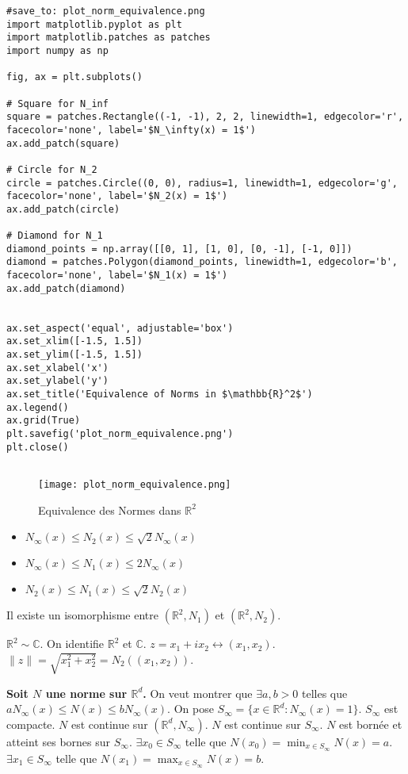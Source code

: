 \documentclass{article}
\begin{document}
\begin{verbatim}
#save_to: plot_norm_equivalence.png
import matplotlib.pyplot as plt
import matplotlib.patches as patches
import numpy as np

fig, ax = plt.subplots()

# Square for N_inf
square = patches.Rectangle((-1, -1), 2, 2, linewidth=1, edgecolor='r', facecolor='none', label='$N_\infty(x) = 1$')
ax.add_patch(square)

# Circle for N_2
circle = patches.Circle((0, 0), radius=1, linewidth=1, edgecolor='g', facecolor='none', label='$N_2(x) = 1$')
ax.add_patch(circle)

# Diamond for N_1
diamond_points = np.array([[0, 1], [1, 0], [0, -1], [-1, 0]])
diamond = patches.Polygon(diamond_points, linewidth=1, edgecolor='b', facecolor='none', label='$N_1(x) = 1$')
ax.add_patch(diamond)


ax.set_aspect('equal', adjustable='box')
ax.set_xlim([-1.5, 1.5])
ax.set_ylim([-1.5, 1.5])
ax.set_xlabel('x')
ax.set_ylabel('y')
ax.set_title('Equivalence of Norms in $\mathbb{R}^2$')
ax.legend()
ax.grid(True)
plt.savefig('plot_norm_equivalence.png')
plt.close()


\end{verbatim}

\begin{figure}[h]
    \centering
    \texttt{[image: plot\_norm\_equivalence.png]}
    \caption{Equivalence des Normes dans $\mathbb{R}^2$}
    \label{fig:plot_norm_equivalence}
\end{figure}
\begin{itemize}
    \item $N_\infty(x) \leq N_2(x) \leq \sqrt{2} N_\infty(x)$
    \item $N_\infty(x) \leq N_1(x) \leq 2 N_\infty(x)$
    \item $N_2(x) \leq N_1(x) \leq \sqrt{2} N_2(x)$
\end{itemize}
Il existe un isomorphisme entre $(\mathbb{R}^2, N_1)$ et $(\mathbb{R}^2, N_2)$.

$\mathbb{R}^2 \sim \mathbb{C}$. On identifie $\mathbb{R}^2$ et $\mathbb{C}$.
$z = x_1 + ix_2 \leftrightarrow (x_1, x_2)$.
$\|z\| = \sqrt{x_1^2 + x_2^2} = N_2((x_1, x_2))$.

\textbf{Soit $N$ une norme sur $\mathbb{R}^d$.}
On veut montrer que $\exists a, b > 0$ telles que $a N_\infty(x) \leq N(x) \leq b N_\infty(x)$.
On pose $S_\infty = \{x \in \mathbb{R}^d : N_\infty(x) = 1\}$.
$S_\infty$ est compacte.
$N$ est continue sur $(\mathbb{R}^d, N_\infty)$.
$N$ est continue sur $S_\infty$.
$N$ est bornée et atteint ses bornes sur $S_\infty$.
$\exists x_0 \in S_\infty$ telle que $N(x_0) = \min_{x \in S_\infty} N(x) = a$.
$\exists x_1 \in S_\infty$ telle que $N(x_1) = \max_{x \in S_\infty} N(x) = b$.
\end{document}
